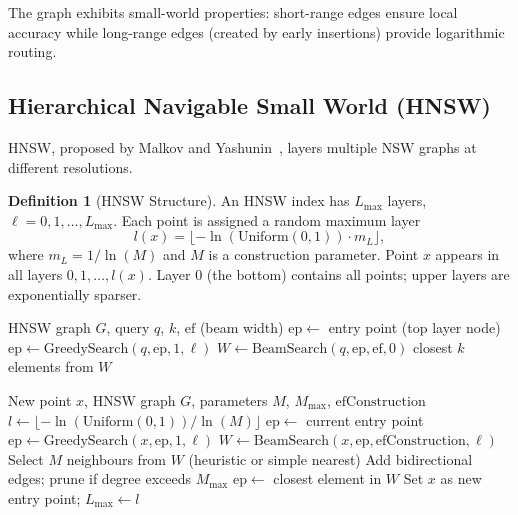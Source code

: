 \documentclass[11pt,a4paper]{article}
\theoremstyle{definition}
\newtheorem{definition}{Definition}[section]
\begin{document}
The graph exhibits small-world properties: short-range edges ensure local
accuracy while long-range edges (created by early insertions) provide
logarithmic routing.

\subsection{Hierarchical Navigable Small World (HNSW)}\label{subsec:hnsw}

HNSW, proposed by Malkov and Yashunin~\cite{malkov2018hnsw}, layers multiple NSW graphs
at different resolutions.

\begin{definition}[HNSW Structure]
An HNSW index has $L_{\max}$ layers, $\ell = 0, 1, \ldots, L_{\max}$.
Each point is assigned a random maximum layer
\[
  l(x) = \lfloor -\ln(\mathrm{Uniform}(0,1)) \cdot m_L \rfloor,
\]
where $m_L = 1/\ln(M)$ and $M$ is a construction parameter.
Point $x$ appears in all layers $0, 1, \ldots, l(x)$.  Layer 0
(the bottom) contains all points; upper layers are exponentially
sparser.
\end{definition}

\begin{algorithm}[H]
\caption{HNSW Search}
\begin{algorithmic}[1]
\Require HNSW graph $G$, query $q$, $k$, $\mathrm{ef}$ (beam width)
\State $\mathrm{ep} \gets$ entry point (top layer node)
 
  \State $\mathrm{ep} \gets \text{GreedySearch}(q, \mathrm{ep}, 1, \ell)$
\EndFor
\State $W \gets \text{BeamSearch}(q, \mathrm{ep}, \mathrm{ef}, 0)$
\State \Return closest $k$ elements from $W$
\end{algorithmic}
\end{algorithm}

\begin{algorithm}[H]
\caption{HNSW Insertion}
\begin{algorithmic}[1]
\Require New point $x$, HNSW graph $G$, parameters $M$, $M_{\max}$, $\mathrm{efConstruction}$
\State $l \gets \lfloor -\ln(\mathrm{Uniform}(0,1)) / \ln(M) \rfloor$
\State $\mathrm{ep} \gets$ current entry point
  \State $\mathrm{ep} \gets \text{GreedySearch}(x, \mathrm{ep}, 1, \ell)$
\EndFor
{}
  \State $W \gets \text{BeamSearch}(x, \mathrm{ep}, \mathrm{efConstruction}, \ell)$
  \State Select $M$ neighbours from $W$ (heuristic or simple nearest)
  \State Add bidirectional edges; prune if degree exceeds $M_{\max}$
  \State $\mathrm{ep} \gets$ closest element in $W$
\EndFor
{}
  \State Set $x$ as new entry point; $L_{\max} \gets l$
\EndIf
\end{algorithmic}
\end{algorithm}
\end{document}
